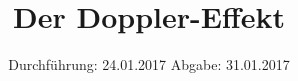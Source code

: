 

\subject{V104}
\title{Der Doppler-Effekt}
\date{
\centering
  Durchführung: 24.01.2017
  \hspace{3em}
  Abgabe: 31.01.2017
}



\maketitle
\thispagestyle{empty}
\tableofcontents
\newpage








\printbibliography


